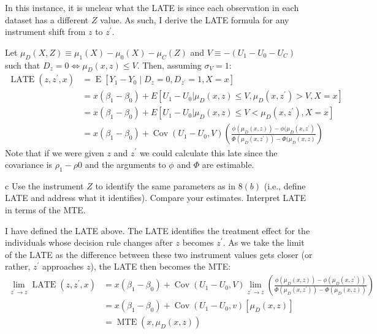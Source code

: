 \documentclass{article}
\begin{document}
\begin{solution}
In this instance, it is unclear what the LATE is since each observation in each dataset has a different $Z$ value. As such, I derive the LATE formula for any instrument shift from $z$ to $z^\prime$. 

Let $\mu_D(X,Z) \equiv \mu_1(X)- \mu_0(X) - \mu_C(Z)$ and $V \equiv - (U_1 - U_0 - U_C)$ such that $D_z = 0 \Leftrightarrow \mu_D(x,z) \leq V $. Then, assuming $\sigma_V=1$:
\begin{align*}
    \operatorname{LATE}(z,z^\prime,x) &= \operatorname{E}[Y_1 - Y_0 \mid D_z = 0, D_{z^\prime}=1,X=x] \\
    &= x(\beta_1 - \beta_0) + E[U_1-U_0 | \mu_D(x,z) \leq V, \mu_D(x,z^\prime) > V, X=x] \\
    &= x(\beta_1 - \beta_0) + E[U_1-U_0 | \mu_D(x,z) \leq V < \mu_D(x,z^\prime) , X=x] \\
    &= x(\beta_1 - \beta_0) + \operatorname{Cov}(U_1-U_0,V) 
    \left( \frac{\phi(\mu_D(x,z))-\phi(\mu_D(x,z^\prime)}{\Phi(\mu_D(x,z^\prime))-\Phi(\mu_D(x,z)} \right)
\end{align*}
Note that if we were given $z$ and $z^\prime$ we could calculate this late since the covariance is $\rho_1 - \rho0$ and the arguments to $\phi$ and $\Phi$ are estimable.
\end{solution}

\begin{problem}{c}
Use the instrument $Z$ to identify the same parameters as in $8(b)$ (i.e., define LATE and address what it identifies). Compare your estimates. Interpret LATE in terms of the MTE.
\end{problem}
\begin{solution}
I have defined the LATE above. The LATE identifies the treatment effect for the individuals whose decision rule changes after $z$ becomes $z^\prime$. As we take the limit of the LATE as the difference between these two instrument values gets closer (or rather, $z^\prime$ approaches $z$), the LATE then becomes the MTE:
\begin{align*}
    \lim _{z^{\prime} \rightarrow z} \operatorname{LATE}\left(z, z^{\prime}, x\right)
    &=x\left(\beta_{1}-\beta_{0}\right)+\operatorname{Cov}\left(U_{1}-U_{0}, V\right) \lim _{z^{\prime} \rightarrow z}\left(\frac{\phi(\mu_D(x,z))-\phi\left(\mu_D(x,z^\prime)\right)}{\Phi\left(\mu_D(x,z^\prime)\right)-\Phi(\mu_D(x,z))}\right) \\
&=x\left(\beta_{1}-\beta_{0}\right)+\operatorname{Cov}\left(U_{1}-U_{0}, v\right)[\mu_D(x,z)] \\
&=\operatorname{MTE}(x,\mu_D(x,z))
\end{align*}
\end{solution}
\end{document}
